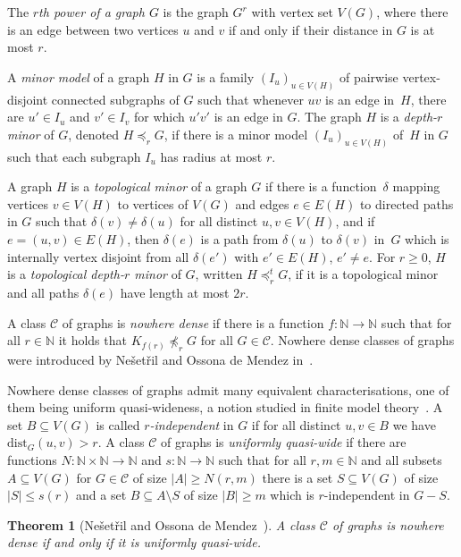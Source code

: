 \documentclass[11pt, fleqn]{article}
\theoremstyle{plain}
\newtheorem{theorem}{Theorem}
\theoremstyle{nonumberplain}
\newcommand{\CCC}{\mathcal{C}}
\newcommand{\N}{\mathbb{N}}
\newcommand{\minor}{\preccurlyeq}
\newcommand{\dist}{\mathrm{dist}}
\newcommand{\abs}[1]{\ensuremath{\left\lvert#1\right\rvert}}
\begin{document}
The \emph{$r$th power of a graph $G$} is the graph $G^r$
with vertex set $V(G)$, where there is an edge between two 
vertices $u$ and $v$ if and only if their distance in $G$ is at most $r$. 

A {\em{minor model}} of a graph $H$ in $G$ is a family $(I_u)_{u\in V(H)}$ of pairwise vertex-disjoint connected subgraphs of $G$
such that whenever $uv$ is an edge in~$H$, there are $u'\in I_u$ and $v'\in I_v$ for which $u'v'$ 
is an edge in $G$.
The graph $H$ is a {\em{depth-$r$ minor}} of $G$, denoted $H\minor_rG$, if there is a minor model
$(I_u)_{u\in V(H)}$ of~$H$ in $G$ such that each subgraph $I_u$ has radius at most $r$.

A graph $H$ is a \emph{topological minor} of a graph $G$ if there is a
function~$\delta$ mapping vertices $v\in V(H)$ to vertices of $V(G)$ and 
edges $e\in E(H)$ to directed paths in $G$ such that 
$\delta(v)\neq \delta(u)$ for all distinct $u,v\in V(H)$, and 
if $e=(u,v)\in E(H)$, then $\delta(e)$ is a path from 
$\delta(u)$ to $\delta(v)$ in~$G$ which is internally vertex disjoint from all 
$\delta(e')$ with $e'\in E(H)$, $e'\neq e$. 
For $r\geq 0$, $H$ is a \emph{topological depth-$r$ minor} of $G$, 
written $H\minor_r^tG$, if it is a topological minor and all paths $\delta(e)$
have length at most $2r$. 

A class $\CCC$ of graphs is \emph{nowhere dense} if there is a function 
$f:\N\rightarrow \N$ such that for all $r\in \N$ it holds that $K_{f(r)}\not\minor_r G$
for all $G\in \CCC$. Nowhere dense classes of graphs were introduced by
Ne\v{s}et\v{r}il and Ossona de Mendez in~\cite{nevsetvril2010first,nevsetvril2011nowhere}.

Nowhere dense classes of graphs admit many equivalent characterisations, 
one of them being uniform quasi-wideness, a notion studied in 
finite model theory~\cite{dawar2010homomorphism}.  
A set $B\subseteq V(G)$ is called {\em{$r$-independent}} in $G$ if for all
distinct $u,v\in B$ we have $\dist_G(u,v)>r$.
A class $\CCC$ of graphs is \emph{uniformly quasi-wide} if there are
functions $N\colon \N\times\N\rightarrow \N$ and $s:\N\rightarrow \N$ such
that for all $r,m\in \N$ and all subsets $A\subseteq V(G)$ for
$G\in \CCC$ of size $\abs{A}\geq N(r,m)$ there is a set
$S\subseteq V(G)$ of size $\abs{S}\leq s(r)$ and a set
$B\subseteq A\setminus S$ of size $\abs{B}\geq m$ which is $r$-independent in
$G-S$. 

\begin{theorem}[Ne\v{s}et\v{r}il and Ossona de Mendez~\cite{nevsetvril2010first}]
A class $\CCC$ of graphs is nowhere dense if and only if it
is uniformly quasi-wide. 
\end{theorem}
\end{document}
